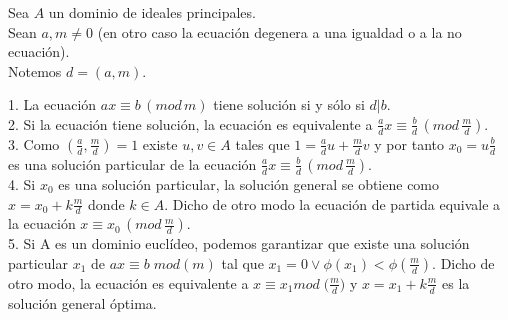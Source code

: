 \begin{theorem}
Sea $A$ un dominio de ideales principales. \\
Sean $a,m \neq 0$ (en otro caso la ecuación degenera a una igualdad o a la no ecuación). \\
Notemos $d=(a,m)$.

1. La ecuación $ax \equiv b \, (mod \, m)$ tiene solución si y sólo si $d | b$.\\
2. Si la ecuación tiene solución, la ecuación es equivalente a $\frac{a}{d}x \equiv \frac{b}{d} \, (mod \, \frac{m}{d})$.\\
3. Como $(\frac{a}{d},\frac{m}{d}) = 1$ existe $u,v \in A$ tales que $1 = \frac{a}{d}u+\frac{m}{d}v$ y por tanto $x_0 = u\frac{b}{d}$ es una solución particular de la ecuación $\frac{a}{d}x \equiv \frac{b}{d} \, (mod \, \frac{m}{d})$.\\
4. Si $x_0$ es una solución particular, la solución general se obtiene como $x = x_0 + k \frac{m}{d}$ donde $k \in A$. Dicho de otro modo la ecuación de partida equivale a la ecuación $x \equiv x_0 \, (mod \, \frac{m}{d})$.\\
5. Si A es un dominio euclídeo, podemos garantizar que existe una solución particular $x_1$ de $ax \equiv b \; mod(m)$ tal que $x_1 = 0 \lor \phi(x_1) < \phi(\frac{m}{d})$. Dicho de otro modo, la ecuación es equivalente a $x \equiv x_1 mod \; \Big(\frac{m}{d}\Big)$ y $x = x_1 + k\frac{m}{d}$ es la solución general óptima. 
\end{theorem}

